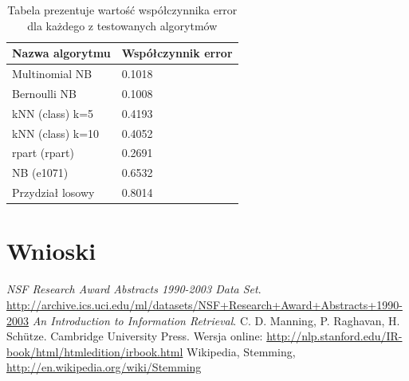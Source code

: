 \documentclass[a4paper,12pt]{article}
\begin{document}
		
		 
		 \begin{table}[!h]
		 	\centering	 	
		 	\begin{tabular}{|l|l|}
		 		\hline
		 		Nazwa algorytmu & Współczynnik error \\
		 		\hline
		 			Multinomial NB & 0.1018	 \\
		 			Bernoulli NB & 0.1008 \\
		 		\hline
		 			kNN (class) k=5 & 0.4193 \\
		 			kNN (class) k=10 & 0.4052 \\
		 			rpart (rpart) & 0.2691 \\
					NB (e1071) & 0.6532 \\	
				\hline
					Przydział losowy & 	0.8014 \\	
		 		\hline
		 	\end{tabular}
		 	\caption{Tabela prezentuje wartość współczynnika error dla
		 	każdego z testowanych algorytmów}
		 \end{table}
		 
		 \clearpage
		 \newpage
\section{Wnioski}


\begin{thebibliography}{9}

   \emph{NSF Research Award Abstracts 1990-2003 Data Set}.
   \url{http://archive.ics.uci.edu/ml/datasets/NSF+Research+Award+Abstracts+1990-2003}
	\emph{An Introduction to Information Retrieval}. 
	C. D. Manning, P. Raghavan, H. Sch\"utze.
	Cambridge University Press.
	Wersja online: \url{http://nlp.stanford.edu/IR-book/html/htmledition/irbook.html}
	Wikipedia, Stemming, \url{http://en.wikipedia.org/wiki/Stemming}

\end{thebibliography}
\end{document}
